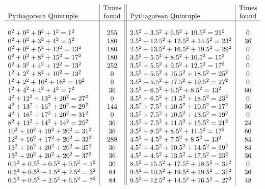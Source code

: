 \documentclass[12pt,table]{article}
\theoremstyle{definition}
\theoremstyle{remark}
\numberwithin{equation}{section}
\begin{document}
\begin{appendices}
\begin{figure}
\[
\begin{array}{l|c||l|c}
                  &\mbox{Times}    &   &\mbox{Times}\\ 
\mbox{Pythagorean Quintuple}     &\mbox{found}
&\mbox{Pythagorean Quintuple}     &\mbox{found}\\ \hline
&&&\\
0^2+ 0^2+ 0^2+ 1^2  = 1^2 & 255
& 2.5^2+ 3.5^2+ 6.5^2+ 19.5^2  = 21^2 &0\\
0^2+ 0^2+ 3^2+ 4^2  = 5^2 &180
&2.5^2+ 12.5^2+ 12.5^2+ 14.5^2  = 23^2 &36\\
0^2+ 0^2+ 5^2+ 12^2  = 13^2 &180&
2.5^2+ 13.5^2+ 16.5^2+ 19.5^2  = 29^2 &0\\
%
0^2+ 0^2+ 8^2+ 15^2  = 17^2 &180&
3.5^2+ 5.5^2+ 8.5^2+ 10.5^2  = 15^2 &0\\
%
0^2+ 3^2+ 4^2+ 12^2  = 13^2 &252&
3.5^2+ 5.5^2+ 9.5^2+ 12.5^2  = 17^2 &0\\
%
1^2+ 2^2+ 8^2+ 10^2  = 13^2 &0&
3.5^2+ 5.5^2+ 15.5^2+ 18.5^2  = 25^2 &0\\
%
1^2+ 2^2+ 10^2+ 16^2  = 19^2 &0&
3.5^2+ 5.5^2+ 17.5^2+ 19.5^2  = 27^2 &0\\
%
1^2+ 4^2+ 4^2+ 4^2  = 7^2 &36&
3.5^2+ 6.5^2+ 6.5^2+ 8.5^2  = 13^2 &60\\
%
4^2+ 12^2+ 13^2+ 20^2  = 27^2 &0&
3.5^2+ 6.5^2+ 11.5^2+ 18.5^2  = 23^2 &0\\
%
4^2+ 13^2+ 16^2+ 20^2  = 29^2 &144&
3.5^2+ 7.5^2+ 10.5^2+ 10.5^2  = 17^2 &36\\
%
4^2+ 16^2+ 17^2+ 20^2  = 31^2 &0&
3.5^2+ 7.5^2+ 10.5^2+ 13.5^2  = 19^2 &0\\
%
8^2+ 13^2+ 14^2+ 14^2  = 25^2 &36&
3.5^2+ 7.5^2+ 11.5^2+ 15.5^2  = 21^2 &24\\
%
10^2+ 10^2+ 19^2+ 20^2  = 31^2 &36&
3.5^2+ 8.5^2+ 8.5^2+ 11.5^2  = 17^2 &60\\
%
12^2+ 16^2+ 17^2+ 20^2  = 33^2 &288&
4.5^2+ 4.5^2+ 7.5^2+ 8.5^2  = 13^2 &84\\
%
13^2+ 16^2+ 20^2+ 20^2  = 35^2 &36&
4.5^2+ 4.5^2+ 10.5^2+ 14.5^2  = 19^2 &84\\
%
13^2+ 20^2+ 20^2+ 20^2  = 37^2 &36&
4.5^2+ 4.5^2+ 13.5^2+ 17.5^2  = 23^2 &36\\
%
0.5^2+ 0.5^2+ 0.5^2+ 0.5^2  = 1^2 &30&
8.5^2+ 15.5^2+ 17.5^2+ 18.5^2  = 31^2 &0\\
%
0.5^2+ 0.5^2+ 1.5^2+ 2.5^2  = 3^2 &84&
9.5^2+ 10.5^2+ 19.5^2+ 19.5^2  = 31^2 &36\\
%
0.5^2+ 0.5^2+ 2.5^2+ 6.5^2  = 7^2 &84&
9.5^2+ 12.5^2+ 14.5^2+ 16.5^2  = 27^2 &48\\

\end{array}\]
\end{figure}
\end{appendices}
\end{document}
